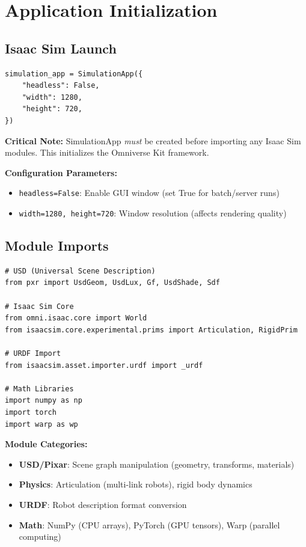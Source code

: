 \documentclass[11pt,a4paper]{article}
\begin{document}
\section{Application Initialization}

\subsection{Isaac Sim Launch}

\begin{lstlisting}
simulation_app = SimulationApp({
    "headless": False,
    "width": 1280,
    "height": 720,
})
\end{lstlisting}

\textbf{Critical Note:} SimulationApp \textit{must} be created before importing any Isaac Sim modules. This initializes the Omniverse Kit framework.

\textbf{Configuration Parameters:}
\begin{itemize}
    \item \texttt{headless=False}: Enable GUI window (set True for batch/server runs)
    \item \texttt{width=1280, height=720}: Window resolution (affects rendering quality)
\end{itemize}

\subsection{Module Imports}

\begin{lstlisting}
# USD (Universal Scene Description)
from pxr import UsdGeom, UsdLux, Gf, UsdShade, Sdf

# Isaac Sim Core
from omni.isaac.core import World
from isaacsim.core.experimental.prims import Articulation, RigidPrim

# URDF Import
from isaacsim.asset.importer.urdf import _urdf

# Math Libraries
import numpy as np
import torch
import warp as wp
\end{lstlisting}

\textbf{Module Categories:}
\begin{itemize}
    \item \textbf{USD/Pixar}: Scene graph manipulation (geometry, transforms, materials)
    \item \textbf{Physics}: Articulation (multi-link robots), rigid body dynamics
    \item \textbf{URDF}: Robot description format conversion
    \item \textbf{Math}: NumPy (CPU arrays), PyTorch (GPU tensors), Warp (parallel computing)
\end{itemize}
\end{document}

